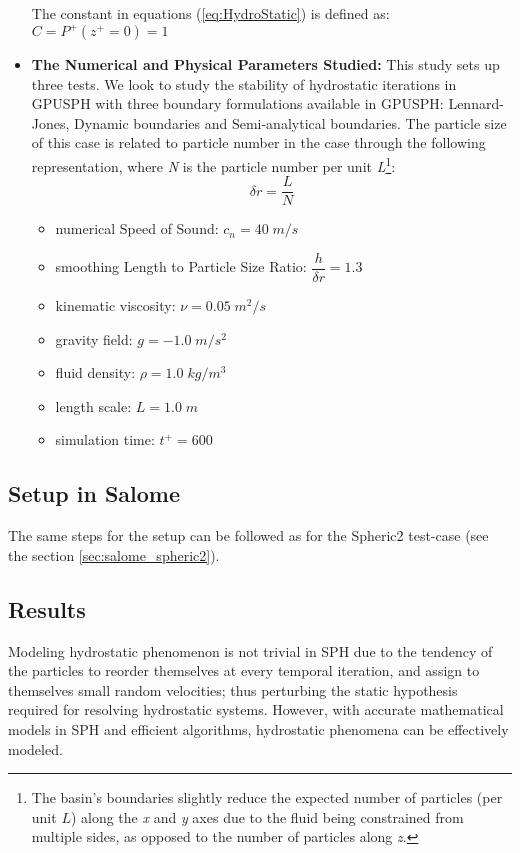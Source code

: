 \documentclass{../GPUSPHtemplate}
\begin{document}
\begin{itemize}
  The constant in equations (\ref{eq:HydroStatic}) is defined as:\\
  $C = P^+(z^+ = 0) = 1$
  
\item \textbf{The Numerical and Physical Parameters Studied:} This study sets up three tests.
  We look to study the stability of hydrostatic iterations in GPUSPH with three boundary formulations available in GPUSPH:
  Lennard-Jones, Dynamic boundaries and Semi-analytical boundaries.
  The particle size of this case is related to particle number in the case through the following representation,
  where \textit{N} is the particle number per unit
  \textit{L}\footnote{The basin's boundaries slightly reduce the expected number of particles (per unit $L$)
    along the \textit{x} and \textit{y} axes due to the fluid being constrained from multiple sides,
    as opposed to the number of particles along \textit{z}. }:
  \begin{equation}
    \delta r = \frac{L}{N} 
  \end{equation}            
  
  \begin{itemize}
  \item numerical Speed of Sound: ${c_n} = 40 \; m/s$
  \item smoothing Length to Particle Size Ratio: $\dfrac{h}{\delta r}=1.3$ 
  \item kinematic viscosity: $\nu = 0.05 \; {m^2}/{s}$
  \item gravity field: $g = -1.0 \; {m}/{s^2}$
  \item fluid density: $\rho = 1.0 \; {kg}/{m^3} $
  \item length scale: $L = 1.0 \; m$
  \item simulation time: $t^+ = 600 $ 
  \end{itemize}
\end{itemize}

\subsection{Setup in Salome}

The same steps for the setup can be followed as for the Spheric2 test-case (see the section \ref{sec:salome_spheric2}).

\subsection{Results}
Modeling hydrostatic phenomenon is not trivial in SPH due to the tendency of the particles
to reorder themselves at every temporal iteration, and assign to themselves small random velocities;
thus perturbing the static hypothesis required for resolving hydrostatic systems. However, with accurate
mathematical models in SPH and efficient algorithms, hydrostatic phenomena can be effectively modeled.\\
\end{document}
